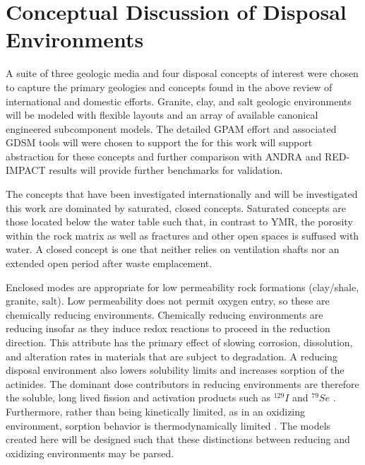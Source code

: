 \section{Conceptual Discussion of Disposal Environments}





A suite of three geologic media and four disposal concepts of interest were
chosen to capture the primary geologies and concepts found in the above review 
of international and domestic efforts. Granite, clay, and salt geologic 
environments will be modeled with flexible layouts and an array of available 
canonical engineered subcomponent models.  The detailed \gls{GPAM} effort and 
associated \gls{GDSM} tools will were chosen to support the for this work will 
support abstraction for these concepts and further comparison with \gls{ANDRA} 
and RED-IMPACT results will provide further benchmarks for validation.  

The concepts that have been investigated internationally and will be
investigated this work are dominated by saturated, closed concepts. Saturated 
concepts are those located below the water table such that, in contrast to 
\gls{YMR}, the porosity within the rock matrix as well as fractures 
and other open spaces is suffused with water. A closed concept is one that 
neither relies on ventilation shafts nor an extended open period after waste 
emplacement.

Enclosed modes are appropriate for low permeability rock formations (clay/shale, 
granite, salt).  Low permeability does not permit oxygen entry, so these are
chemically reducing environments.  Chemically reducing environments are reducing 
insofar as they induce  redox reactions to proceed in the reduction direction. This 
attribute has the primary effect of slowing corrosion, dissolution, and  
alteration rates in materials that are subject to degradation. A reducing 
disposal environment also lowers solubility limits and increases sorption of the 
actinides. The dominant dose contributors in reducing environments are 
therefore the soluble, long lived fission and activation products such as $^{129}I$ 
and $^{79}Se$ \cite{oecd-nea_advanced_2006, von_lensa_red-impact_2008}.  
Furthermore, rather than being kinetically limited, as in an oxidizing 
environment, sorption behavior is thermodynamically limited 
\cite{nutt_personal_2011, schwartz_fundamentals_2004}. The models created here 
will be designed such that these distinctions between reducing and oxidizing 
environments may be parsed. 

